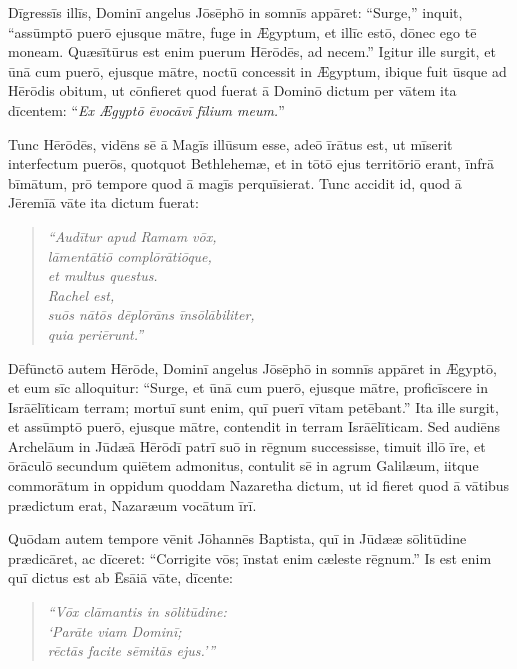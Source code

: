 \Versus Dīgressīs illīs, Dominī angelus Jōsēphō in somnīs appāret: ``Surge,'' inquit, ``assūm\-ptō puerō ejusque mātre, fuge in Ægyptum, et illīc estō, dōnec ego tē moneam. Quæsī\-tūrus est enim puerum Hērōdēs, ad necem.'' 
\Versus Igitur ille surgit, et ūnā cum puerō, ejusque mātre, noctū concessit in Ægyptum, 
\Versus ibique fuit ūsque ad Hērōdis obitum, ut cōnfieret quod fuerat ā Dominō dictum per vātem ita dīcentem: ``\emph{Ex Ægyptō ēvocāvī fīlium meum.}''

\Versus Tunc Hērōdēs, vidēns sē ā Magīs illūsum esse, adeō īrātus est, ut mīserit interfectum puerōs, quotquot Bethlehemæ, et in tōtō ejus territōriō erant, īnfrā bīmātum, prō tempore quod ā magīs perquīsierat. 
\Versus Tunc accidit id, quod ā Jēremīā vāte ita dictum fuerat: 

\begin{verse}
\begin{patverse*}
\Versus \emph{``Audītur apud Ramam vōx,\\
lāmentātiō complōrātiōque,\\
et multus questus.\\
Rachel est,\\
suōs nātōs dēplōrāns īnsōlābiliter,\\
quia periērunt.''}
\end{patverse*}
\end{verse}

\Versus Dēfūnctō autem Hērōde, Dominī angelus Jōsēphō in somnīs appāret in Ægyptō, 
\Versus et eum sīc alloquitur: ``Surge, et ūnā cum puerō, ejusque mātre, proficīscere in Isrāēlīticam terram; mortuī sunt enim, quī puerī vītam petēbant.'' 
\Versus Ita ille surgit, et assūmptō puerō, ejusque mātre, contendit in terram Isrāēlīticam. 
\Versus Sed audiēns Archelāum in Jūdæā Hērōdī patrī suō in rēgnum successisse, timuit illō īre, et ōrāculō secundum quiētem admonitus, contulit sē in agrum Galilæum, 
\Versus iitque commorātum in oppidum quoddam Nazaretha dictum, ut id fieret quod ā vātibus prædictum erat, Nazaræum vocātum īrī.
 

\Caput
\Versus Quōdam autem tempore vēnit Jōhannēs Baptista, quī in Jūdææ sōlitūdine prædicāret,
\Versus ac dīceret: ``Corrigite vōs; īnstat enim cæleste rēgnum.''
\Versus Is est enim quī dictus est ab Ēsāiā vāte, dīcente:
\begin{verse}
\begin{patverse*}
\emph{``Vōx clāmantis in sōlitūdine:\\
`Parāte viam Dominī;\\
rēctās facite sēmitās ejus.'{}''}
\end{patverse*}
\end{verse}

